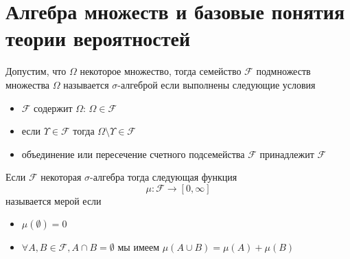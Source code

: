 \section{Алгебра множеств и базовые понятия теории вероятностей}

\begin{definition}
\label{def:sigma_algebra}
Допустим, что $\Omega$ некоторое множество, тогда семейство
$\mathcal{F}$ подмножеств множества $\Omega$ называется
$\sigma$-алгеброй если выполнены следующие условия
\begin{itemize}
\item $\mathcal{F}$ содержит $\Omega$: $\Omega \in \mathcal{F}$
\item если $\Upsilon  \in \mathcal{F}$ тогда $\Omega \setminus \Upsilon
  \in \mathcal{F}$
\item объединение или пересечение счетного подсемейства $\mathcal{F}$
  принадлежит $\mathcal{F}$
\end{itemize}
\end{definition}

\begin{definition}[Мера]
\label{def:measure} 
Если $\mathcal{F}$ некоторая $\sigma$-алгебра тогда
следующая функция 
\[
\mu: \mathcal{F} \to \left[0, \infty\right]
\]
называется мерой если 
\begin{itemize}
\item $\mu\left(\emptyset\right) = 0$
\item $\forall A, B \in \mathcal{F}, A \cap B = \emptyset$ мы имеем
$\mu\left(A \cup B\right) = \mu\left(A\right) +
  \mu\left(B\right)$ 
\end{itemize}
\end{definition}

